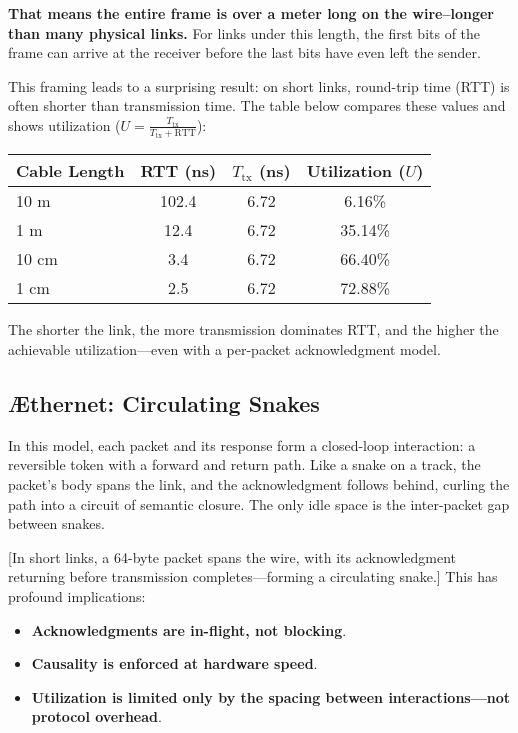 \documentclass[../../../OAE-SPEC-MAIN.tex]{subfiles}
\begin{document}
\textbf{That means the entire frame is over a meter long on the wire--longer than many physical links.} For links under this length, the first bits of the frame can arrive at the receiver before the last bits have even left the sender.

This framing leads to a surprising result: on short links, round-trip time (RTT) is often shorter than transmission time. The table below compares these values and shows utilization (\( U = \frac{T_{\text{tx}}}{T_{\text{tx}} + \text{RTT}} \)):

\begin{center}
\begin{tabular}{@{}lccc@{}}
\toprule
Cable Length & RTT (ns) & $T_{\text{tx}}$ (ns) & Utilization ($U$) \\
\midrule
10 m  & 102.4  & 6.72   & 6.16\% \\
1 m   & 12.4   & 6.72   & 35.14\% \\
10 cm & 3.4    & 6.72   & 66.40\% \\
1 cm  & 2.5    & 6.72   & 72.88\% \\
\bottomrule
\end{tabular}
\end{center}

The shorter the link, the more transmission dominates RTT, and the higher the achievable utilization—even with a per-packet acknowledgment model.

\subsection{\AE thernet: Circulating Snakes}

In this model, each packet and its response form a closed-loop interaction: a reversible token with a forward and return path. Like a snake on a track, the packet’s body spans the link, and the acknowledgment follows behind, curling the path into a circuit of semantic closure. The only idle space is the inter-packet gap between snakes.

[In short links, a 64-byte packet spans the wire, with its acknowledgment returning before transmission completes—forming a circulating snake.]
This has profound implications:

\begin{itemize}
  \item \textbf{Acknowledgments are in-flight, not blocking}.
  \item \textbf{Causality is enforced at hardware speed}.
  \item \textbf{Utilization is limited only by the spacing between interactions—not protocol overhead}.
\end{itemize}
\end{document}
